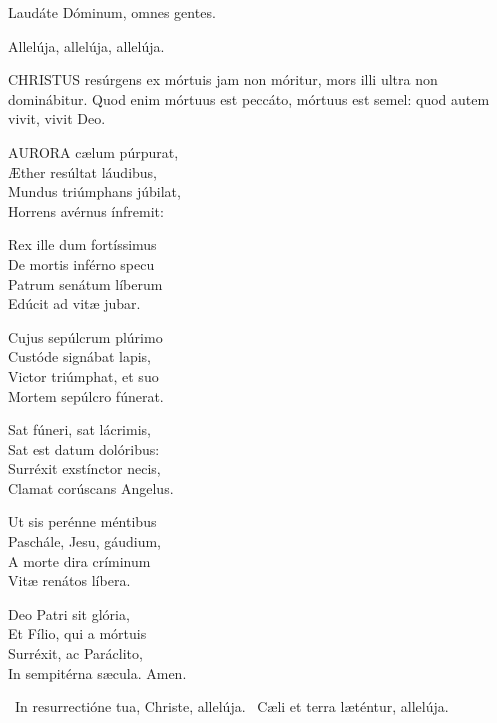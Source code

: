 
 Laudáte Dóminum, omnes gentes.


 Allelúja, allelúja, allelúja.



\lettrine[lines=2]{C}{HRISTUS} resúrgens ex mórtuis jam non móritur, mors illi ultra non dominábitur. Quod enim mórtuus est peccáto, mórtuus est semel: quod autem vivit, vivit Deo.


\lettrine[lines=2]{A}{URORA} cælum púrpurat,\\
Æther resúltat láudibus,\\
Mundus triúmphans júbilat,\\
Horrens avérnus ínfremit:

Rex ille dum fortíssimus\\
De mortis inférno specu\\
Patrum senátum líberum\\
Edúcit ad vitæ jubar.

Cujus sepúlcrum plúrimo\\
Custóde signábat lapis,\\
Victor triúmphat, et suo\\
Mortem sepúlcro fúnerat.

Sat fúneri, sat lácrimis,\\
Sat est datum dolóribus:\\
Surréxit exstínctor necis,\\
Clamat corúscans Angelus.

Ut sis perénne méntibus\\
Paschále, Jesu, gáudium,\\
A morte dira críminum\\
Vitæ renátos líbera.

Deo Patri sit glória,\\
Et Fílio, qui a mórtuis\\
Surréxit, ac Paráclito,\\
In sempitérna sæcula. Amen.

\V\ In resurrectióne tua, Christe, allelúja. \R\ Cæli et terra læténtur, allelúja.


